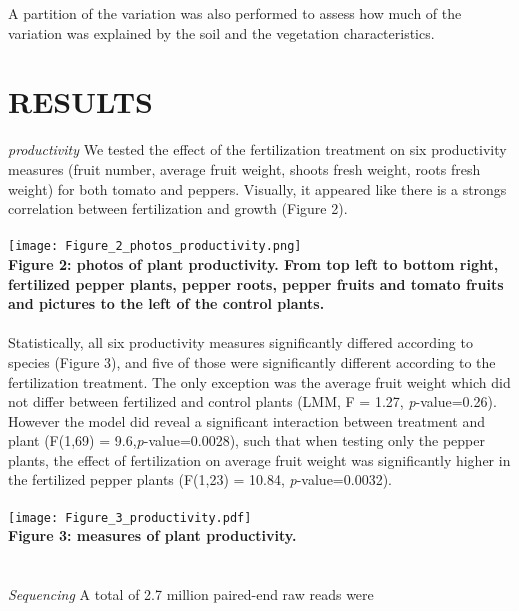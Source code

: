 \documentclass[11pt,]{article}
\begin{document}
A partition of the variation was also performed to assess how much of
the variation was explained by the soil and the vegetation
characteristics. ~

\newpage  

\section{RESULTS}\label{results}

\emph{productivity} We tested the effect of the fertilization treatment
on six productivity measures (fruit number, average fruit weight, shoots
fresh weight, roots fresh weight) for both tomato and peppers. Visually,
it appeared like there is a strongs correlation between fertilization
and growth (Figure 2).\\
\hspace*{0.333em}\\
\texttt{[image: Figure\_2\_photos\_productivity.png]}\\
\textbf{Figure 2: photos of plant productivity. From top left to bottom
right, fertilized pepper plants, pepper roots, pepper fruits and tomato
fruits and pictures to the left of the control plants.}\\
\hspace*{0.333em}\\
Statistically, all six productivity measures significantly differed
according to species (Figure 3), and five of those were significantly
different according to the fertilization treatment. The only exception
was the average fruit weight which did not differ between fertilized and
control plants (LMM, F = 1.27, \emph{p}-value=0.26). However the model
did reveal a significant interaction between treatment and plant
(F(1,69) = 9.6,\emph{p}-value=0.0028), such that when testing only the
pepper plants, the effect of fertilization on average fruit weight was
significantly higher in the fertilized pepper plants (F(1,23) = 10.84,
\emph{p}-value=0.0032).\\
\hspace*{0.333em}\\
\texttt{[image: Figure\_3\_productivity.pdf]}\\
\textbf{Figure 3: measures of plant productivity.}\\
\hspace*{0.333em}\\
\hspace*{0.333em}\\
\emph{Sequencing} A total of 2.7 million paired-end raw reads were
\end{document}
